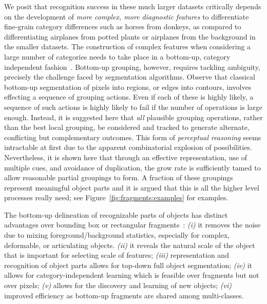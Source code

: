 % 
We posit that recognition success in these
much larger datasets critically depends on the development of \textit{more complex,  more diagnostic features} to differentiate fine-grain category differences
such as horses from
donkeys, as compared to differentiating airplanes from potted plants or
airplanes from the background in the smaller datasets. The construction of complex features when considering
a large number of categories needs to take place in a bottom-up, category independent fashion~\cite{Dickinson:CategoryBook09}. 
 Bottom-up grouping, however, requires tackling ambiguity, precisely the challenge faced by segmentation algorithms. Observe that classical
bottom-up segmentation of pixels into regions, or edges into contours,
involves
effecting a sequence of grouping actions. Even if each of these is  highly likely, a sequence of such actions is  highly likely to fail if the number of operations is large enough. Instead, it is  suggested here that \textit{all} plausible grouping operations, rather than the best local grouping, be considered and tracked to generate alternate, conflicting but complementary outcomes. This 
form of \textit{perceptual reasoning} seems intractable at first due to the apparent combinatorial explosion of possibilities. Nevertheless, it is shown here that through an effective
representation, use of multiple cues, and avoidance of duplication, the grow rate is sufficiently tamed to allow reasonable partial groupings
to form. A fraction of these groupings represent meaningful object parts and it is argued that this is all the higher level processes really
need; see Figure~\ref{fig:fragments:examples} for examples.  

The bottom-up delineation of recognizable parts of objects has distinct advantages over bounding box or rectangular fragments~\cite{Vidal-Naquet:Ullman:iccv03}: \textit{(i)} it removes the noise due to mixing foreground/background statistics, especially for complex, deformable, or articulating objects. \textit{(ii)} it reveals the natural scale of the object that is important for selecting scale of features;\textit{ (iii)} representation and recognition of object parts allows for top-down full object segmentation; \textit{(iv)} it allows for category-independent learning which is feasible over fragments
but not over pixels; \textit{(v)} allows for the discovery and learning of new objects; \textit{(vi)} improved efficiency as bottom-up fragments
are shared among multi-classes. 

